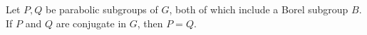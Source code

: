 Let $P, Q$ be parabolic subgroups of $G$, both of which include a Borel subgroup $B$. If $P$ and $Q$ are conjugate in $G$, then $P = Q$.
